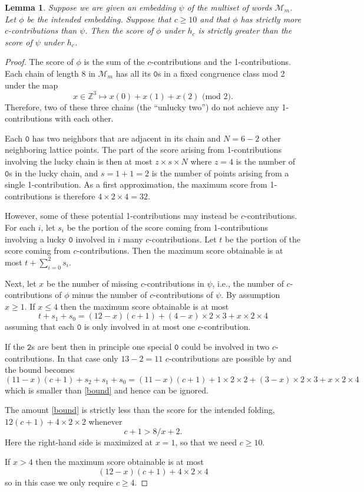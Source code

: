\documentclass{article}
\newtheorem{lemma}[theorem]{Lemma}
\newcommand{\mt}{\mathtt}
\begin{document}
\begin{lemma}\label{levels-required}
	Suppose we are given an embedding $\psi$ of the multiset of words $\mathscr M_m$.
	Let $\phi$ be the intended embedding.
	Suppose that $c\ge 10$ and that $\phi$ has strictly more $c$-contributions than $\psi$.
	Then the score of $\phi$ under $h_c$ is strictly greater than the score of $\psi$ under $h_c$.
\end{lemma}
\begin{proof}
	The score of $\phi$ is the sum of the $c$-contributions and the 1-contributions.
	Each chain of length 8 in $\mathscr M_m$ has all its $\mt 0$s in a fixed congruence class mod 2
	under the map
	\[
		x\in \mathbb Z^3 \mapsto x(0)+x(1)+x(2)\text{ (mod 2).}
	\]
	Therefore, two of these three chains (the ``unlucky two'') do not achieve any 1-contributions with each other.

	Each $\mt 0$ has two neighbors that are adjacent in its chain and $N=6-2$ other neighboring lattice points.
	The part of the score arising from 1-contributions involving the lucky chain is then at most $z \times s \times N$
	where $z=4$ is the number of $\mt 0$s in the lucky chain, and $s=1+1=2$ is the number of points arising from a single 1-contribution.
	As a first approximation, the maximum score from 1-contributions is therefore $4\times 2\times 4 = 32$.

	However, some of these potential 1-contributions may instead be $c$\--contributions.
	For each $i$, let $s_i$ be the portion of the score coming from 1-contributions involving a lucky $\mt 0$ involved in $i$ many $c$-contributions.
	Let $t$ be the portion of the score coming from $c$-contributions.
	Then the maximum score obtainable is at most $t+\sum_{i=0}^2 s_i$.

	Next, let $x$ be the number of missing $c$-contributions in $\psi$, i.e., the number of $c$-contributions of $\phi$
	minus the number of $c$-contributions of $\psi$.
	By assumption $x\ge 1$.
	If $x\le 4$ then the maximum score obtainable is at most
	\begin{equation}\label{bound}
		t + s_1 + s_0 = (12-x)(c+1) + (4-x)\times 2\times 3 + x \times 2 \times 4
	\end{equation}
	assuming that each $\mt 0$ is only involved in at most one $c$-contribution.

	If the $\mt 2$s are bent then
	in principle one special $\mt 0$ could be involved in two $c$-contributions.
	In that case only $13-2=11$ $c$-contributions are possible by  and the bound becomes
	\[
			(11-x)(c+1) + s_2 + s_1 + s_0 = (11-x)(c+1) + 1\times 2\times 2  + (3-x)\times 2\times 3 + x \times 2 \times 4
	\]
	which is smaller than \eqref{bound} and hence can be ignored.


	The amount \eqref{bound} is strictly less than the score for the intended folding,
	\(
		12(c+1) + 4\times 2\times 2
	\)
	whenever
	\[
		c+1 > 8/x +2.
	\]
	Here the right-hand side is maximized at $x=1$, so that we need $c \ge 10$.

	If $x>4$ then the maximum score obtainable is at most
	\[
		(12-x)(c+1) + 4 \times 2 \times 4
	\]
	so in this case we only require $c\ge 4$.
\end{proof}
\end{document}
